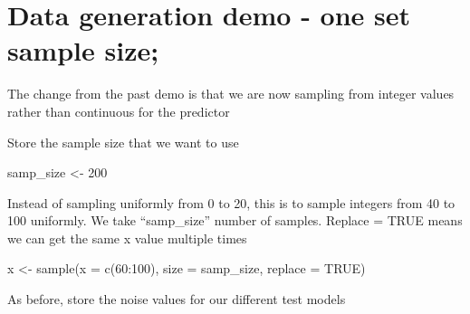 \documentclass[
]{book}
\newenvironment{Shaded}{\begin{snugshade}}{\end{snugshade}}
\newcommand{\AttributeTok}[1]{\textcolor[rgb]{0.77,0.63,0.00}{#1}}
\newcommand{\ConstantTok}[1]{\textcolor[rgb]{0.00,0.00,0.00}{#1}}
\newcommand{\DecValTok}[1]{\textcolor[rgb]{0.00,0.00,0.81}{#1}}
\newcommand{\FunctionTok}[1]{\textcolor[rgb]{0.00,0.00,0.00}{#1}}
\newcommand{\NormalTok}[1]{#1}
\newcommand{\OtherTok}[1]{\textcolor[rgb]{0.56,0.35,0.01}{#1}}
\newcommand{\SpecialCharTok}[1]{\textcolor[rgb]{0.00,0.00,0.00}{#1}}
\begin{document}
\hypertarget{data-generation-demo---one-set-sample-size-1}{%
\section{Data generation demo - one set sample size;}\label{data-generation-demo---one-set-sample-size-1}}

The change from the past demo is that we are now sampling from integer values rather than continuous for the predictor

Store the sample size that we want to use

\begin{Shaded}
\begin{Highlighting}[]
\NormalTok{samp\_size }\OtherTok{\textless{}{-}} \DecValTok{200}
\end{Highlighting}
\end{Shaded}

Instead of sampling uniformly from 0 to 20, this is to sample integers from 40 to 100 uniformly.
We take ``samp\_size'' number of samples. Replace = TRUE means we can get the same x value multiple times

\begin{Shaded}
\begin{Highlighting}[]
\NormalTok{x }\OtherTok{\textless{}{-}} \FunctionTok{sample}\NormalTok{(}\AttributeTok{x =} \FunctionTok{c}\NormalTok{(}\DecValTok{60}\SpecialCharTok{:}\DecValTok{100}\NormalTok{), }\AttributeTok{size =}\NormalTok{ samp\_size, }\AttributeTok{replace =} \ConstantTok{TRUE}\NormalTok{)}
\end{Highlighting}
\end{Shaded}

As before, store the noise values for our different test models
\end{document}
